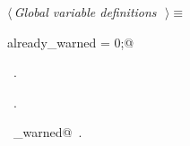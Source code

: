 \documentclass{report}
\begin{document}
\begin{flushleft} \small
\begin{minipage}{\linewidth} \label{scrap155}
$\langle\,${\it Global variable definitions}\nobreak\ {\footnotesize {}}$\,\rangle\equiv$
\vspace{-1ex}
\begin{list}{}{} \item
\mbox{}\verb@int already_warned = 0;@\\
\mbox{}\verb@@{\NWsep}
\end{list}
\vspace{-1ex}
\footnotesize\addtolength{\baselineskip}{-1ex}
\begin{list}{}{\setlength{\itemsep}{-\parsep}\setlength{\itemindent}{-\leftmargin}}
\item \NWtxtMacroDefBy\ .
\item \NWtxtMacroRefIn\ .
\end{list}
\vspace{-2ex}
\footnotesize\addtolength{\baselineskip}{-1ex}
\begin{list}{}{\setlength{\itemsep}{-\parsep}\setlength{\itemindent}{-\leftmargin}}
\item \NWtxtIdentsUsed\nobreak\  \verb@already_warned@\nobreak\ .\end{list}
\end{minipage}\\[4ex]
\end{flushleft}
\end{document}
